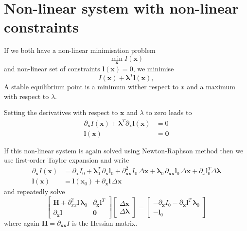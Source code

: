 \documentclass[10pt,a4paper]{book}
\newcommand{\p}{\partial}
\begin{document}
\section{Non-linear system with non-linear constraints}
If we both have a non-linear minimisation problem 
\[
\min_{\bm{x}} I(\bm{x})
\]
and non-linear set of constraints $\bm{l}(\bm{x})=0$, we minimise
\[
I(\bm{x}) + \bm{\lambda}^T \bm{l}(\bm{x}) ,
\]
A stable equilibrium point is a minimum wither respect to $x$ and a maximum with respect to $\lambda$.


Setting the derivatives with respect to $\bm{x}$ and $\lambda$ to zero leads to
\begin{align*}
\p_{\bm{x}} I(\bm{x}) + \bm{\lambda}^T \p_{\bm{x}} \bm{l}(\bm{x}) &=0\\
\bm{l} (\bm{x}) &= \bm{0}
\end{align*}


If this non-linear system is again solved using Newton-Raphson method
then we use first-order Taylor expansion and write
\begin{align*}
\p_{\bm{x}} I(\bm{x}) &= \p_{\bm{x}} I_0+ \bm{\lambda}_0^T \, \p_{\bm{x}} \bm{l}_0  + \p^2_{\bm{xx}} I_0 \, \Delta \bm{x} + \bm{\lambda}_0 \, \p_{\bm{x}\bm{x}} \bm{l}_0 \,\Delta \bm{x} + \p_x \bm{l}^T_0 \Delta \bm{\lambda} \\
\bm{l}(\bm{x}) &= \bm{l}(\bm{x}_0) + \p_{\bm{x}} \bm{l}  \, \Delta \bm{x} 
\end{align*}
and repeatedly solve
\begin{equation}
\left [ \begin{array}{cc}
\bm{H}+\p^2_{xx} \bm{l} \, \bm{\lambda}_0  & \p_{\bm{x}} \bm{l}^T  \\
\p_{\bm{x}} \bm{l} & \bm{0} 
\end{array} \right ]
\left [ \begin{array}{c}
\Delta \bm{x} \\
\Delta \bm{\lambda}
\end{array} \right ]
=\left [ \begin{array}{c}
-\p_{\bm{x}} I_0 - \p_{\bm{x}} \bm{l}^T \, \bm{\lambda}_0 \\
-\bm{l}_0
\end{array} \right ]
\label{eq:System}
\end{equation}
where again $\bm{H}=\p_{\bm{xx}} I$ is the Hessian matrix.
\end{document}
